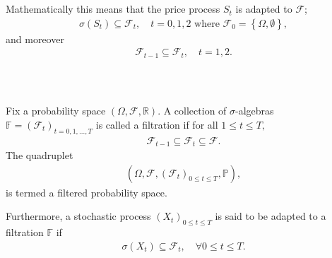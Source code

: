 \documentclass{beamer}
\numberwithin{equation}{section}
\begin{document}
\begin{frame}\frametitle{{\normalsize \secname} \\ {\large \subsecname}}
    Mathematically this means that the price process $S_t$ is adapted to $\mathscr{F}$;
    \begin{align}
        \sigma(S_t) \subseteq \mathscr{F}_t, \quad  t = 0,1,2 \text{ where } \mathscr{F}_0 = \left\{ \Omega, \emptyset \right\},
    \end{align}
    and moreover
    \begin{align}
        \mathscr{F}_{t - 1} \subseteq \mathscr{F}_t, \quad t = 1,2.
    \end{align}
\end{frame}

\begin{frame}\frametitle{{\normalsize \secname} \\ {\large \subsecname}}
    \begin{definition}
        Fix a probability space $(\Omega, \mathscr{F}, \mathbb{R})$.
        A collection of $\sigma$-algebras $\mathbb{F} = \left(\mathscr{F}_t\right)_{t = 0,1,\ldots,T}$ is called a filtration if for all $1 \leq t \leq T,$
        \begin{align}
            \mathscr{F}_{t - 1} \subseteq \mathscr{F}_{t} \subseteq \mathscr{F}.
        \end{align}
        The quadruplet
        \begin{align}
            (\Omega, \mathscr{F}, \left(\mathscr{F}_t\right)_{0 \leq t \leq T}, \mathbb{P}),
        \end{align}
        is termed a filtered probability space.

        Furthermore, a stochastic process $(X_t)_{0 \leq t \leq T}$ is said to be adapted to a filtration $\mathbb{F}$ if
        \begin{align}
            \sigma(X_t) \subseteq \mathscr{F}_t, \quad \forall 0 \leq t \leq T.
        \end{align}
    \end{definition}
\end{frame}
\end{document}
